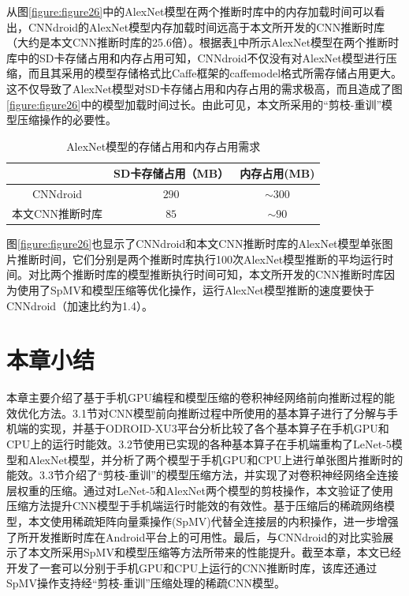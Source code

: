 从图\ref{figure:figure26}中的AlexNet模型在两个推断时库中的内存加载时间可以看出，CNNdroid的AlexNet模型内存加载时间远高于本文所开发的CNN推断时库（大约是本文CNN推断时库的25.6倍）。根据表\ref{table:tabledroid}中所示AlexNet模型在两个推断时库中的SD卡存储占用和内存占用可知，CNNdroid不仅没有对AlexNet模型进行压缩，而且其采用的模型存储格式比Caffe框架的caffemodel格式所需存储占用更大。这不仅导致了AlexNet模型对SD卡存储占用和内存占用的需求极高，而且造成了图\ref{figure:figure26}中的模型加载时间过长。由此可见，本文所采用的“剪枝-重训”模型压缩操作的必要性。


\begin{table}[htbp]
  \centering
  \caption{AlexNet模型的存储占用和内存占用需求}
  \label{table:tabledroid}
  \begin{tabular}{ccc}
    \toprule
       & SD卡存储占用（MB）& 内存占用(MB) \\
    \midrule
      CNNdroid & $290$ & $\sim 300$ \\
      本文CNN推断时库& $85$ & $\sim 90$ \\
    \bottomrule
  \end{tabular}
\end{table}


图\ref{figure:figure26}也显示了CNNdroid和本文CNN推断时库的AlexNet模型单张图片推断时间，它们分别是两个推断时库执行100次AlexNet模型推断的平均运行时间。对比两个推断时库的模型推断执行时间可知，本文所开发的CNN推断时库因为使用了SpMV和模型压缩等优化操作，运行AlexNet模型推断的速度要快于CNNdroid（加速比约为1.4）。


\section{本章小结}

本章主要介绍了基于手机GPU编程和模型压缩的卷积神经网络前向推断过程的能效优化方法。3.1节对CNN模型前向推断过程中所使用的基本算子进行了分解与手机端的实现，并基于ODROID-XU3平台分析比较了各个基本算子在手机GPU和CPU上的运行时能效。3.2节使用已实现的各种基本算子在手机端重构了LeNet-5模型和AlexNet模型，并分析了两个模型于手机GPU和CPU上进行单张图片推断时的能效。3.3节介绍了“剪枝-重训”的模型压缩方法，并实现了对卷积神经网络全连接层权重的压缩。通过对LeNet-5和AlexNet两个模型的剪枝操作，本文验证了使用压缩方法提升CNN模型于手机端运行时能效的有效性。基于压缩后的稀疏网络模型，本文使用稀疏矩阵向量乘操作(SpMV)代替全连接层的内积操作，进一步增强了所开发推断时库在Android平台上的可用性。最后，与CNNdroid的对比实验展示了本文所采用SpMV和模型压缩等方法所带来的性能提升。截至本章，本文已经开发了一套可以分别于手机GPU和CPU上运行的CNN推断时库，该库还通过SpMV操作支持经“剪枝-重训”压缩处理的稀疏CNN模型。

\cleardoublepage
